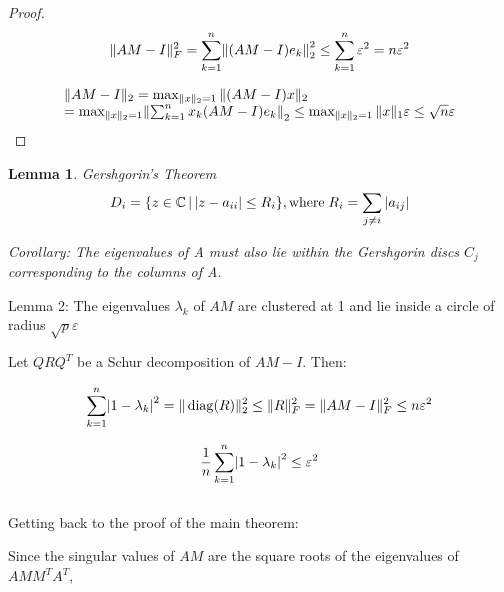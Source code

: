 \documentclass[paper=A4, fontsize=11pt]{scrartcl}
\let\originalleft\left
\let\originalright\right
\renewcommand{\left}{\mathopen{}\mathclose\bgroup\originalleft}
\renewcommand{\right}{\aftergroup\egroup\originalright}
\newtheorem{lemma}{Lemma}
\begin{document}
\begin{proof}

\begin{equation}
\|A M-I\|_{F}^{2}=\sum_{k=1}^{n}\left\|(A M-I) e_{k}\right\|_{2}^{2} \leq \sum_{k=1}^{n} \varepsilon^{2}=n \varepsilon^{2}
\end{equation}

\begin{equation}
\begin{array}{l}{\|A M-I\|_{2}=\max _{\|x\|_{2}=1}\|(A M-I) x\|_{2}} \\ {=\max _{\|x\|_{2}=1}\left\|\sum_{k=1}^{n} x_{k}(A M-I) e_{k}\right\|_{2} \leq \max _{\|x\|_{2}=1}\|x\|_{1} \varepsilon \leq \sqrt{n} \varepsilon}\end{array}
\end{equation}
\end{proof}

\begin{lemma}
	
Gershgorin's Theorem \\

\begin{equation}
D_{i}=\left\{z \in \mathbb{C} \, | \, | z-a_{i i} | \leq R_{i}\right\}, \text{where} \; R_{i}=\sum_{j \neq i}\, \left|a_{i j}\right|
\end{equation}

Corollary: The eigenvalues of A must also lie within the Gershgorin discs $C_j$ corresponding to the columns of A. \\
\end{lemma}

Lemma 2:
The eigenvalues $\lambda_k$ of $AM$ are clustered at 1 and lie inside a circle of radius $\sqrt{p} \varepsilon$

Let $Q R Q^{T}$ be a Schur decomposition of $A M-I$. Then:

\begin{equation}
\sum_{k=1}^{n}\left|1-\lambda_{k}\right|^{2}=\|\operatorname{diag}(R)\|_{2}^{2} \leq\|R\|_{F}^{2}=\|A M-I\|_{F}^{2} \leq n \varepsilon^{2}
\end{equation}

\begin{equation}
\frac{1}{n} \sum_{k=1}^{n}\left|1-\lambda_{k}\right|^{2} \leq \varepsilon^{2}
\end{equation}
\\

Getting back to the proof of the main theorem:

 Since the singular values of $AM$ are the square roots of the eigenvalues of $A M M^{T} A^{T} $, 
\end{document}
